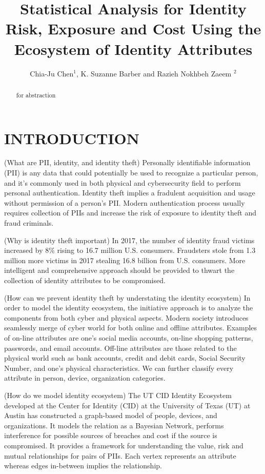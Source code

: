 \documentclass[letterpaper, 10 pt, conference]{ieeeconf}  %
\title{\LARGE \bf
Statistical Analysis for Identity Risk, Exposure
and Cost Using the Ecosystem of Identity Attributes
}
\author{Chia-Ju Chen$^{1}$, K. Suzanne Barber and Razieh Nokhbeh Zaeem $^{2}$} %
\begin{document}
\maketitle
\thispagestyle{empty}
\pagestyle{empty}


\begin{abstract}

for abstraction

\end{abstract}


\section{INTRODUCTION}

(What are PII, identity, and identity theft)
 Personally identifiable information (PII) is any data that could potentially be used to recognize a particular person, and it's commonly used in both physical and cybersecurity field to perform personal authentication. Identity theft implies a fradulent acquisition and usage without permission of a person's PII. Modern authentication process usually requires collection of PIIs and increase the risk of exposure to identity theft and fraud criminals.

(Why is identity theft important) In 2017, the number of identity fraud victims increased by 8\% rising to 16.7 million U.S. consumers. Fraudsters stole from 1.3 million more victims in 2017 stealing 16.8 billion from U.S. consumers. More intelligent and comprehensive approach should be provided to thwart the collection of identity attributes to be compromised. 

(How can we prevent identity theft by understating the identity ecosystem)
In order to model the identity ecosystem, the initiative approach is to analyze the components from both cyber and physical aspects. Modern society introduces seamlessly merge of cyber world for both online and offline attributes. Examples of on-line attributes are one’s social media accounts, on-line shopping patterns, passwords, and email accounts. Off-line attributes are those related to the physical world such as bank accounts, credit and debit cards, Social Security Number, and one’s physical characteristics. We can further classify every attribute in person, device, organization categories.

(How do we model identity ecosystem)
The UT CID Identity Ecosystem developed at the Center for Identity (CID) at the University of Texas (UT) at Austin has constructed a graph-based model of people, devices,
and organizations. It models the relation as a Bayesian Network, performs interference for possible sources of breaches and cost if the source is compromised.
It provides a framework for understanding the value, risk and mutual relationships for pairs of PIIs. Each vertex represents an attribute whereas edges in-between implies the relationship.
\end{document}
